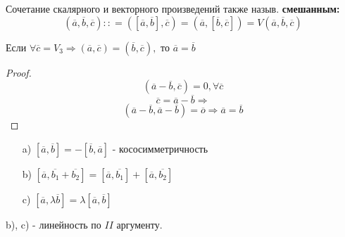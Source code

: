 \begin{note}
  Сочетание скалярного и векторного произведений также назыв. \textbf{смешанным:}
  \[
    (\overline{a}, \overline{b}, \overline{c}) \colon\colon= ([\overline{a}, \overline{b}], \overline{c}) = (\overline{a}, [\overline{b}, \overline{c}]) = V(\overline{a}, \overline{b}, \overline{c})
  \]
\end{note}
\begin{lemma}
Если $\forall \overline{c} = V_3 \Rightarrow (\overline{a}, \overline{c}) = (\overline{b}, \overline{c}),$ то $\overline{a} = \overline{b}$
\end{lemma}
\begin{proof}
  \[
    (\overline{a} - \overline{b}, \overline{c}) = 0, \forall \overline{c}
  \]
  \[
  \overline{c} = \overline{a} - \overline{b} \Rightarrow
  \]
  \[
  (\overline{a} - \overline{b}, \overline{a} - \overline{b}) = \overline{o} \Rightarrow \overline{a} = \overline{b}
  \]
\end{proof}
\begin{theorem} 
  \begin{itemize}
    \item [a) ] $[\overline{a}, \overline{b}] = -[\overline{b}, \overline{a}]$ - кососимметричность
    \item [b) ] $[\overline{a}, \overline{b_1} + \overline{b_2}] = [\overline{a}, \overline{b_1}] + [\overline{a}, \overline{b_2}]$ 
    \item [c) ] $[\overline{a}, \lambda \overline{b}] = \lambda [\overline{a}, \overline{b}]$
  \end{itemize} 
  b), c) - линейность по $II$ аргументу.

\end{theorem}
